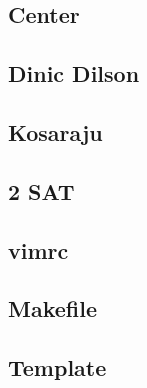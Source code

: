 \documentclass[12pt, a4paper, twoside]{article}
\begin{document}
\subsection{Center}


\subsection{Dinic Dilson}


\subsection{Kosaraju}


\subsection{2 SAT}



%
%

\subsection{vimrc}


\subsection{Makefile}


\subsection{Template}

\end{document}
